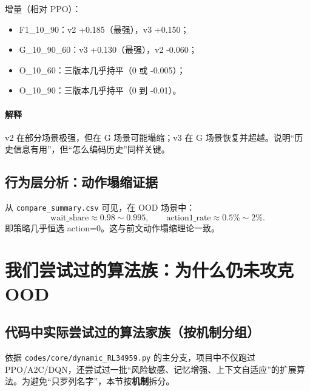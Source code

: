 ﻿\documentclass[11pt,a4paper]{ctexart}
\begin{document}
增量（相对 PPO）：
\begin{itemize}
  \item F1\_10\_90：v2 +0.185（最强），v3 +0.150；
  \item G\_10\_90\_60：v3 +0.130（最强），v2 -0.060；
  \item O\_10\_60：三版本几乎持平（0 或 -0.005）；
  \item O\_10\_90：三版本几乎持平（0 到 -0.01）。
\end{itemize}

\paragraph{解释}
v2 在部分场景极强，但在 G 场景可能塌缩；v3 在 G 场景恢复并超越。说明“历史信息有用”，但“怎么编码历史”同样关键。

\subsection{行为层分析：动作塌缩证据}
从 \texttt{compare\_summary.csv} 可见，在 OOD 场景中：
\begin{equation}
\text{wait\_share}\approx 0.98\sim0.995,\qquad
\text{action1\_rate}\approx 0.5\%\sim2\%.
\end{equation}
即策略几乎恒选 action=0。这与前文动作塌缩理论一致。

\section{我们尝试过的算法族：为什么仍未攻克 OOD}
\subsection{代码中实际尝试过的算法家族（按机制分组）}
依据 \texttt{codes/core/dynamic\_RL34959.py} 的主分支，项目中不仅跑过 PPO/A2C/DQN，还尝试过一批“风险敏感、记忆增强、上下文自适应”的扩展算法。为避免“只罗列名字”，本节按\textbf{机制}拆分。
\end{document}
